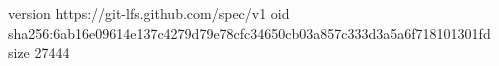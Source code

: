 version https://git-lfs.github.com/spec/v1
oid sha256:6ab16e09614e137c4279d79e78cfc34650cb03a857c333d3a5a6f718101301fd
size 27444
